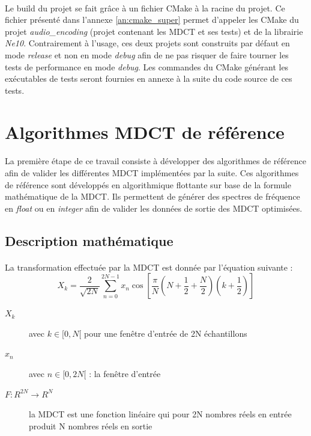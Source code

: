 \documentclass{article}
\begin{document}
    \paragraph{}
    Le build du projet se fait grâce à un fichier CMake à la racine du projet. Ce fichier présenté dans l'annexe \ref{an:cmake_super} permet d'appeler les CMake du projet \emph{audio\_encoding} (projet contenant les MDCT et ses tests) et de la librairie \emph{Ne10}. Contrairement à l'usage, ces deux projets sont construits par défaut en mode \emph{release} et non en mode \emph{debug} afin de ne pas risquer de faire tourner les tests de performance en mode \emph{debug}. Les commandes du CMake générant les exécutables de tests seront fournies en annexe à la suite du code source de ces tests.



    \newpage
    \section{Algorithmes MDCT de référence}

    \paragraph{}
    La première étape de ce travail consiste à développer des algorithmes de référence afin de valider les différentes MDCT implémentées par la suite. Ces algorithmes de référence sont développés en algorithmique flottante sur base de la formule mathématique de la MDCT. Ils permettent de générer des spectres de fréquence en \emph{float} ou en \emph{integer} afin de valider les données de sortie des MDCT optimisées.

    \subsection{Description mathématique}
    \label{sec:desc-math}

    \paragraph{}
    La transformation effectuée par la MDCT est donnée par l'équation suivante\cite{wiki:MDCT} :
    $$X_k = \frac{2}{\sqrt{2N}} \sum_{n=0}^{2N-1} x_n \cos \left[ \frac{\pi}{N} \left( N + \frac{1}{2} + \frac{N}{2} \right) \left( k + \frac{1}{2} \right) \right]$$
    \begin{description}
        \item[$X_k$] avec $k \in [0, N[$ pour une fenêtre d'entrée de 2N échantillons
        \item[$x_n$] avec $n \in [0, 2N[$ : la fenêtre d'entrée
        \item[$F: R^{2N} \rightarrow R^N$] la MDCT est une fonction linéaire qui pour 2N nombres réels en entrée produit N nombres réels en sortie
    \end{description}\label{test}
\end{document}
